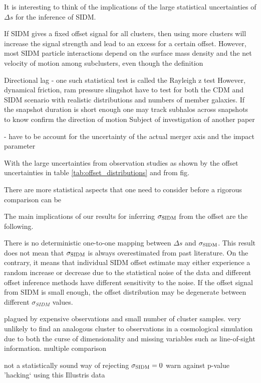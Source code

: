 It is interesting to think of the implications of the large statistical 
uncertainties of $\Delta s$ for the inference of SIDM.

If SIDM gives a fixed offset signal for all clusters, then using more clusters
will increase the signal strength and lead to an excess for a certain offset. 
However, most SIDM particle interactions depend on the surface mass
density and the net velocity of motion among subclusters, even though the definition 

Directional lag - one such statistical test is called the Rayleigh z test  
However, dynamical friction, ram pressure slingshot have to test for both the
CDM and SIDM scenario with realistic distributions and numbers of member galaxies.  
If the snapshot duration is short enough
 one may track subhalos across snapshots to know confirm the
direction of motion  Subject of investigation of another paper 



- have to be account for the uncertainty of the actual merger
axis and the impact parameter  


With the large uncertainties from observation studies as shown by the offset
uncertainties in table \ref{tab:offset_distributions} and from fig. 

There are more statistical aspects that one need to consider before a rigorous
comparison can be 


The main implications of our results for inferring $\sigma_{\rm SIDM}$ from the
offset are the following.

There is no deterministic one-to-one mapping between $\Delta s$ and 
$\sigma_{\rm SIDM}$.  
This result does not mean that $\sigma_{\rm SIDM}$ is always overestimated from
past literature. 
On the contrary, it means that individual SIDM offset estimate may either
experience a random increase or decrease due to the statistical noise of 
 the data and different offset inference methods have different sensitivity to 
 the noise.
If the offset signal from SIDM is small enough, the offset distribution may be
degenerate between different $\sigma_{SIDM}$ values.


plagued by expensive observations and small number of cluster samples.
very unlikely to find an analogous cluster to observations in a cosmological simulation 
due to both the curse of dimensionality and missing variables such as
line-of-sight information.
multiple comparison 

not a statistically sound way of rejecting $\sigma_{\rm SIDM} = 0$
warn against p-value 'hacking` using this Illustris data


